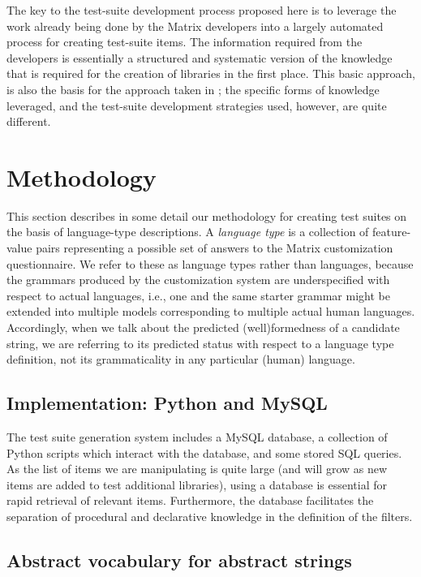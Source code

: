 \documentclass[11pt]{article}
\begin{document}
The key to the test-suite development process proposed here is to
leverage the work already being done by the Matrix developers into a
largely automated process for creating test-suite items. The
information required from the developers is essentially a structured
and systematic version of the knowledge that is required for the
creation of libraries in the first place.  This basic
approach, is also the basis for the approach taken in
\cite{bro:00}; the specific forms of knowledge leveraged, and the
test-suite development strategies used, however, are quite different.



\section{Methodology}
\label{arch}

This section describes in some detail our methodology for creating
test suites on the basis of language-type descriptions.  A {\it
language type} is a collection of feature-value pairs representing a
possible set of answers to the Matrix customization questionnaire. We
refer to these as language types rather than languages, because the
grammars produced by the customization system are underspecified with
respect to actual languages, i.e., one and the same starter grammar
might be extended into multiple models corresponding to multiple
actual human languages.  Accordingly, when we talk about the predicted
(well)formedness of a candidate string, we are referring to its
predicted status with respect to a language type definition, not its
grammaticality in any particular (human) language.

\subsection{Implementation: Python and MySQL}

The test suite generation system includes a MySQL database, a collection
of Python scripts which interact with the database, and some stored
SQL queries.  As the list of items we are manipulating is quite large
(and will grow as new items are added to test additional libraries),
using a database is essential for rapid retrieval of relevant items.
Furthermore, the database facilitates the separation of procedural
and declarative knowledge in the definition of the filters.

\subsection{Abstract vocabulary for abstract strings}
\end{document}
